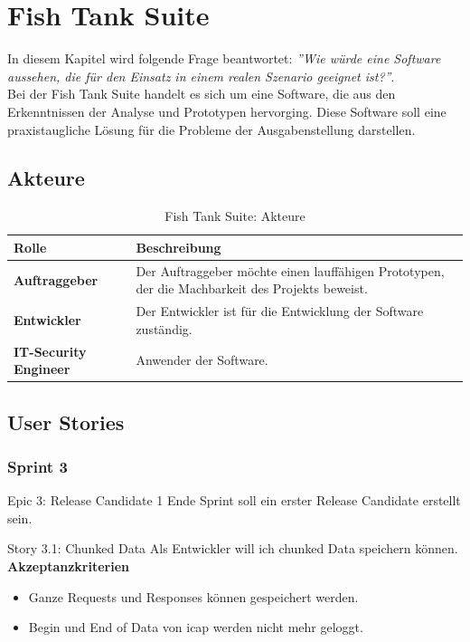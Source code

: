 \chapter{Fish Tank Suite}
\label{fts:chapter}
In diesem Kapitel wird folgende Frage beantwortet: \textit{''Wie würde eine Software aussehen, die für den Einsatz in einem realen Szenario geeignet ist?''}.\\

Bei der Fish Tank Suite handelt es sich um eine Software, die aus den Erkenntnissen der Analyse und Prototypen hervorging. Diese Software soll eine praxistaugliche Lösung für die Probleme der Ausgabenstellung darstellen.

\section{Akteure}
\begin{table}[H]
    \centering
    \begin{tabularx}{\textwidth}{| l | X |}
        \hline
        \textbf{Rolle}     & \textbf{Beschreibung}    \\ \hline
        \textbf{Auftraggeber}  & Der Auftraggeber möchte einen lauffähigen Prototypen, der die Machbarkeit des Projekts beweist.  \\ \hline
        \textbf{Entwickler} & Der Entwickler ist für die Entwicklung der Software zuständig.   \\ \hline
        \textbf{IT-Security Engineer} & Anwender der Software.   \\ \hline
    \end{tabularx}
    \caption{Fish Tank Suite: Akteure}
\end{table}

\section{User Stories}
\subsection{Sprint 3}
\begin{epic}{Epic 3: Release Candidate 1}
  Ende Sprint soll ein erster Release Candidate erstellt sein.
\end{epic}

\begin{story}{Story 3.1:  Chunked Data}
  Als Entwickler will ich chunked Data speichern können.
  \tcblower
  \textbf{Akzeptanzkriterien}
  \begin{itemize}
  	\item Ganze Requests und Responses können gespeichert werden.
  	\item Begin und End of Data von \gls{icap} werden nicht mehr geloggt.
  \end{itemize}
\end{story}

